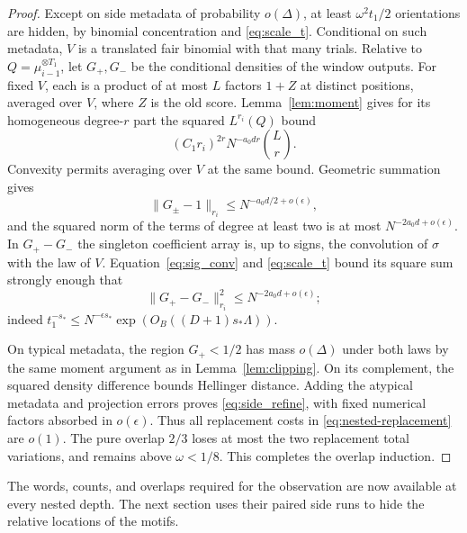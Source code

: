 \begin{proof}
Except on side metadata of probability $o(\Delta)$, at least $\omega^2t_1/2$ orientations are hidden, by binomial concentration and \eqref{eq:scale_t}.  Conditional on such metadata, $V$ is a translated fair binomial with that many trials.  Relative to $Q=\mu_{i-1}^{\otimes T_1}$, let $G_+,G_-$ be the conditional densities of the window outputs.  For fixed $V$, each is a product of at most $L$ factors $1+Z$ at distinct positions, averaged over $V$, where $Z$ is the old score.  Lemma~\ref{lem:moment} gives for its homogeneous degree-$r$ part the squared $L^{r_i}(Q)$ bound
\[
 (C_1r_i)^{2r}N^{-a_0dr}\binom Lr.
\]
Convexity permits averaging over $V$ at the same bound.  Geometric summation gives
\[
 \|G_\pm-1\|_{r_i}\le N^{-a_0d/2+o(\epsilon)},
\]
and the squared norm of the terms of degree at least two is at most $N^{-2a_0d+o(\epsilon)}$.  In $G_+-G_-$ the singleton coefficient array is, up to signs, the convolution of $\sigma$ with the law of $V$.  Equation~\eqref{eq:sig_conv} and \eqref{eq:scale_t} bound its square sum strongly enough that
\[
 \|G_+-G_-\|_{r_i}^2\le N^{-2a_0d+o(\epsilon)};
\]
indeed $t_1^{-s_*}\le N^{-\epsilon s_*}
\exp(O_B((D+1)s_*\Lambda))$.

On typical metadata, the region $G_+<1/2$ has mass $o(\Delta)$ under both laws by the same moment argument as in Lemma~\ref{lem:clipping}.  On its complement, the squared density difference bounds Hellinger distance.  Adding the atypical metadata and projection errors proves \eqref{eq:side_refine}, with fixed numerical factors absorbed in $o(\epsilon)$.  Thus all replacement costs in \eqref{eq:nested-replacement} are $o(1)$.  The pure overlap $2/3$ loses at most the two replacement total variations, and remains above $\omega<1/8$.  This completes the overlap induction.
\end{proof}

The words, counts, and overlaps required for the observation are now available at every nested depth.  The next section uses their paired side runs to hide the relative locations of the motifs.
